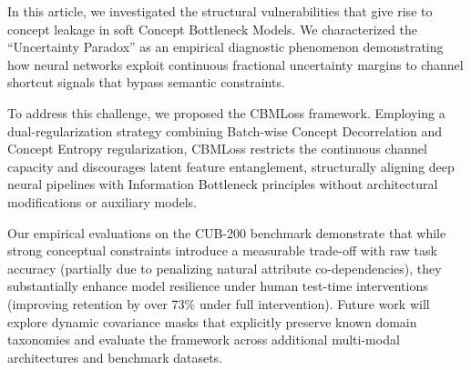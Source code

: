 \documentclass[times,twocolumn,final]{elsarticle}
\begin{document}
In this article, we investigated the structural vulnerabilities that give rise to concept leakage in soft Concept Bottleneck Models. We characterized the ``Uncertainty Paradox'' as an empirical diagnostic phenomenon demonstrating how neural networks exploit continuous fractional uncertainty margins to channel shortcut signals that bypass semantic constraints.

To address this challenge, we proposed the CBMLoss framework. Employing a dual-regularization strategy combining Batch-wise Concept Decorrelation and Concept Entropy regularization, CBMLoss restricts the continuous channel capacity and discourages latent feature entanglement, structurally aligning deep neural pipelines with Information Bottleneck principles without architectural modifications or auxiliary models.

Our empirical evaluations on the CUB-200 benchmark demonstrate that while strong conceptual constraints introduce a measurable trade-off with raw task accuracy (partially due to penalizing natural attribute co-dependencies), they substantially enhance model resilience under human test-time interventions (improving retention by over 73\% under full intervention). Future work will explore dynamic covariance masks that explicitly preserve known domain taxonomies and evaluate the framework across additional multi-modal architectures and benchmark datasets.




\end{document}
